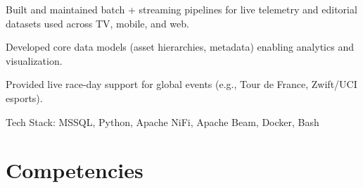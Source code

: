 \documentclass[]{deedy-resume-openfont}
\begin{document}
\begin{minipage}[t]{0.66\textwidth}
\sectionsep

\vspace{\topsep}
\begin{tightemize}
\item Built and maintained batch + streaming pipelines for live telemetry and editorial datasets used across TV, mobile, and web.
\item Developed core data models (asset hierarchies, metadata) enabling analytics and visualization.
\item Provided live race-day support for global events (e.g., Tour de France, Zwift/UCI esports).
\end{tightemize}
Tech Stack: MSSQL, Python, Apache NiFi, Apache Beam, Docker, Bash
\sectionsep


\section{Competencies} 
\vspace{\topsep} %

\begin{tabular}{ l l }


\end{tabular}
\end{minipage}
\end{document}
